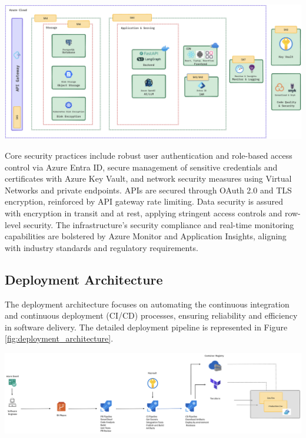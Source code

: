 \begin{center}
    \centering
    \includegraphics[width=1\textwidth]{Images/Security Architecture.png}
    \label{fig:security_architecture}
\end{center}

Core security practices include robust user authentication and role-based access control via Azure Entra ID, secure management of sensitive credentials and certificates with Azure Key Vault, and network security measures using Virtual Networks and private endpoints. APIs are secured through OAuth 2.0 and TLS encryption, reinforced by API gateway rate limiting. Data security is assured with encryption in transit and at rest, applying stringent access controls and row-level security. The infrastructure’s security compliance and real-time monitoring capabilities are bolstered by Azure Monitor and Application Insights, aligning with industry standards and regulatory requirements.

\subsection{Deployment Architecture}
The deployment architecture focuses on automating the continuous integration and continuous deployment (CI/CD) processes, ensuring reliability and efficiency in software delivery. The detailed deployment pipeline is represented in Figure \ref{fig:deployment_architecture}.

\begin{center}
    \centering
    \includegraphics[width=1\textwidth]{Images/Deployment Architecture.png}
    \label{fig:deployment_architecture}
\end{center}

